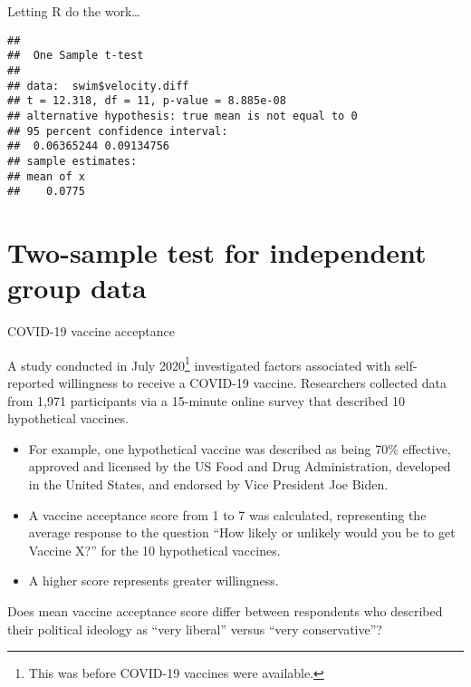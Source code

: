 \documentclass[
  ignorenonframetext,
  aspectratio=169]{beamer}
\newenvironment{Shaded}{\begin{snugshade}}{\end{snugshade}}
\newcommand{\AttributeTok}[1]{\textcolor[rgb]{0.13,0.29,0.53}{#1}}
\newcommand{\CommentTok}[1]{\textcolor[rgb]{0.56,0.35,0.01}{\textit{#1}}}
\newcommand{\DecValTok}[1]{\textcolor[rgb]{0.00,0.00,0.81}{#1}}
\newcommand{\FunctionTok}[1]{\textcolor[rgb]{0.13,0.29,0.53}{\textbf{#1}}}
\newcommand{\NormalTok}[1]{#1}
\newcommand{\SpecialCharTok}[1]{\textcolor[rgb]{0.81,0.36,0.00}{\textbf{#1}}}
\newcommand{\StringTok}[1]{\textcolor[rgb]{0.31,0.60,0.02}{#1}}
\begin{document}
\begin{frame}[fragile]{Letting \textsf{R} do the work\ldots{}}
\protect\hypertarget{letting-do-the-work-1}{}
\scriptsize

\begin{Shaded}
\end{Shaded}

\begin{verbatim}
## 
##  One Sample t-test
## 
## data:  swim$velocity.diff
## t = 12.318, df = 11, p-value = 8.885e-08
## alternative hypothesis: true mean is not equal to 0
## 95 percent confidence interval:
##  0.06365244 0.09134756
## sample estimates:
## mean of x 
##    0.0775
\end{verbatim}
\end{frame}

\hypertarget{two-sample-test-for-independent-group-data}{%
\section{Two-sample test for independent group
data}\label{two-sample-test-for-independent-group-data}}

\begin{frame}{COVID-19 vaccine acceptance}
\protect\hypertarget{covid-19-vaccine-acceptance}{}
\small

A study conducted in July
2020\footnote{This was before COVID-19 vaccines were available.}
investigated factors associated with self-reported willingness to
receive a COVID-19 vaccine. Researchers collected data from 1,971
participants via a 15-minute online survey that described 10
hypothetical vaccines.

\begin{itemize}
\item
  For example, one hypothetical vaccine was described as being 70\%
  effective, approved and licensed by the US Food and Drug
  Administration, developed in the United States, and endorsed by Vice
  President Joe Biden.
\item
  A vaccine acceptance score from 1 to 7 was calculated, representing
  the average response to the question ``How likely or unlikely would
  you be to get Vaccine X?'' for the 10 hypothetical vaccines.
\item
  A higher score represents greater willingness.
\end{itemize}

Does mean vaccine acceptance score differ between respondents who
described their political ideology as ``very liberal'' versus ``very
conservative''?
\end{frame}
\end{document}
